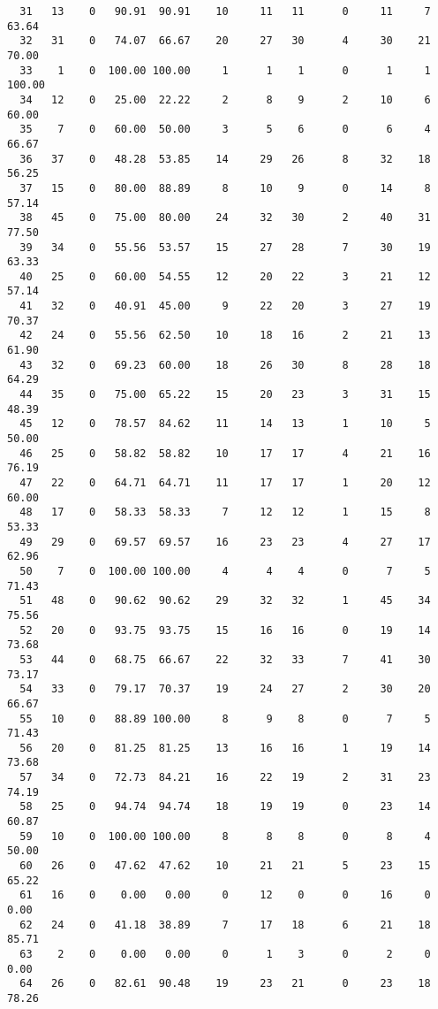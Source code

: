 \begin{verbatim}
  31   13    0   90.91  90.91    10     11   11      0     11     7    63.64
  32   31    0   74.07  66.67    20     27   30      4     30    21    70.00
  33    1    0  100.00 100.00     1      1    1      0      1     1   100.00
  34   12    0   25.00  22.22     2      8    9      2     10     6    60.00
  35    7    0   60.00  50.00     3      5    6      0      6     4    66.67
  36   37    0   48.28  53.85    14     29   26      8     32    18    56.25
  37   15    0   80.00  88.89     8     10    9      0     14     8    57.14
  38   45    0   75.00  80.00    24     32   30      2     40    31    77.50
  39   34    0   55.56  53.57    15     27   28      7     30    19    63.33
  40   25    0   60.00  54.55    12     20   22      3     21    12    57.14
  41   32    0   40.91  45.00     9     22   20      3     27    19    70.37
  42   24    0   55.56  62.50    10     18   16      2     21    13    61.90
  43   32    0   69.23  60.00    18     26   30      8     28    18    64.29
  44   35    0   75.00  65.22    15     20   23      3     31    15    48.39
  45   12    0   78.57  84.62    11     14   13      1     10     5    50.00
  46   25    0   58.82  58.82    10     17   17      4     21    16    76.19
  47   22    0   64.71  64.71    11     17   17      1     20    12    60.00
  48   17    0   58.33  58.33     7     12   12      1     15     8    53.33
  49   29    0   69.57  69.57    16     23   23      4     27    17    62.96
  50    7    0  100.00 100.00     4      4    4      0      7     5    71.43
  51   48    0   90.62  90.62    29     32   32      1     45    34    75.56
  52   20    0   93.75  93.75    15     16   16      0     19    14    73.68
  53   44    0   68.75  66.67    22     32   33      7     41    30    73.17
  54   33    0   79.17  70.37    19     24   27      2     30    20    66.67
  55   10    0   88.89 100.00     8      9    8      0      7     5    71.43
  56   20    0   81.25  81.25    13     16   16      1     19    14    73.68
  57   34    0   72.73  84.21    16     22   19      2     31    23    74.19
  58   25    0   94.74  94.74    18     19   19      0     23    14    60.87
  59   10    0  100.00 100.00     8      8    8      0      8     4    50.00
  60   26    0   47.62  47.62    10     21   21      5     23    15    65.22
  61   16    0    0.00   0.00     0     12    0      0     16     0     0.00
  62   24    0   41.18  38.89     7     17   18      6     21    18    85.71
  63    2    0    0.00   0.00     0      1    3      0      2     0     0.00
  64   26    0   82.61  90.48    19     23   21      0     23    18    78.26

\end{verbatim}
